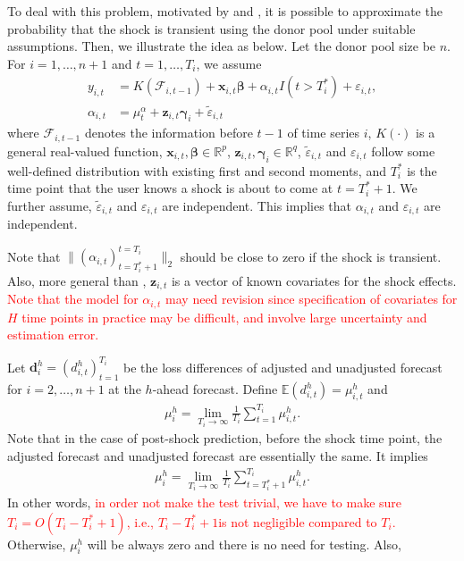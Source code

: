 \documentclass[12pt]{article}
\def\mbf#1{\mathbf{#1}} %
\newcommand{\reals}{\mathbb{R}} %
\def\mc#1{\mathcal{#1}} %
\def\E{\mathbb{E}} %
\def\mc#1{\mathcal{#1}}
\def\bs#1{\boldsymbol{#1}}
\theoremstyle{definition}
\theoremstyle{definition}
\begin{document}
To deal with this problem, motivated by \cite{abadie2010synthetic} and \cite{lin2020minimizing}, it is possible to approximate the probability that the shock is transient using the donor pool  under suitable assumptions. Then, we illustrate the idea as below. Let the donor pool size be $n$. For $i = 1, \ldots, n +1$ and $t = 1, \ldots, T_i$, we assume
\begin{align*}
  y_{i,t} &= K(\mc{F}_{i, t-1}) + \mathbf{x}_{i,t}\boldsymbol{\beta}  + \alpha_{i,t} I(t > T_i^*)+\varepsilon_{i,t},\\
         \alpha_{i,t} &= \mu_{t}^{\alpha} + \mbf{z}_{i,t}\bs{\gamma}_{i} + \tilde{\varepsilon}_{i,t}
\end{align*}
where $\mc{F}_{i, t-1}$  denotes the information  before $t-1$ of time series $i$, $K(\cdot)$ is a general real-valued function, $\mathbf{x}_{i,t},\bs{\beta}\in \reals^{p}$, $\bs{z}_{i,t}, \bs{\gamma}_{i}\in \reals^q$, $\tilde{\varepsilon}_{i,t}$ and $\varepsilon_{i,t}$ follow some well-defined distribution with existing first and second moments, and $T_i^*$ is the time point that the user knows a shock is about to come at $t = T_{i}^*+1$. We further assume, $\tilde{\varepsilon}_{i,t}$ and $\varepsilon_{i,t}$ are  independent. This implies that $\alpha_{i,t}$ and $\varepsilon_{i,t}$ are independent.

Note that $\|{(\alpha_{i,t})_{t=T_i^*+1}^{t=T_i}}\|_2$ should be close to zero if the shock is transient. Also, more general than \cite{lin2020minimizing}, $\mbf{z}_{i,t}$ is a vector of known covariates for the shock effects. \textcolor{red}{Note that the model for $\alpha_{i,t}$ may need revision since specification of covariates for $H$ time points in practice may be difficult, and involve large uncertainty and estimation error.}

Let $\bs{d}_i^h=(d_{i,t}^h)_{t=1}^{T_i}$ be the loss differences of adjusted and unadjusted forecast for $i = 2, \ldots, n+1$ at the $h$-ahead forecast. Define $\E(d_{i,t}^h)=\mu_{i,t}^h$ and
\begin{align*}
  \mu_{i}^h = \lim_{T_i \to \infty} \frac{1}{T_i} \sum_{t=1}^{T_i} \mu_{i,t}^h.
\end{align*}
Note that in the case of post-shock prediction, before the shock time point, the adjusted forecast and unadjusted forecast are essentially the same. It implies
\begin{align*}
  \mu_{i}^h = \lim_{T_i \to \infty} \frac{1}{T_i} \sum_{t=T_i^*+1}^{T_i} \mu_{i,t}^h.
\end{align*}
In other words, \textcolor{red}{in order not make the test trivial, we have to make sure $T_i=O(T_i-T_i^*+1)$, i.e., $T_i-T_i^*+1$is not negligible compared to $T_i$.} Otherwise, $\mu_i^h$ will be always zero and there is no need for testing. Also, 
\end{document}
